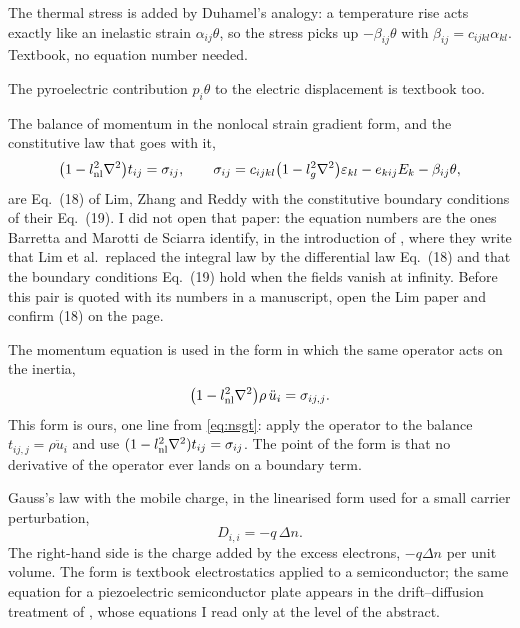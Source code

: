 \documentclass[11pt]{article}
\begin{document}
The thermal stress is added by Duhamel's analogy: a temperature rise acts exactly like an inelastic strain
$\alpha_{ij}\theta$, so the stress picks up $-\beta_{ij}\theta$ with
$\beta_{ij}=c_{ijkl}\alpha_{kl}$. Textbook, no equation number needed.

The pyroelectric contribution $p_i\theta$ to the electric displacement is textbook too.

The balance of momentum in the nonlocal strain gradient form, and the constitutive law that goes with it,
\begin{equation}
\bigl(1-l_{\rm nl}^2\nabla^2\bigr)t_{ij}=\sigma_{ij},\qquad
\sigma_{ij}=c_{ijkl}\bigl(1-l_g^2\nabla^2\bigr)\varepsilon_{kl}
-e_{kij}E_k-\beta_{ij}\theta ,
\label{eq:nsgt}
\end{equation}
are Eq.~(18) of Lim, Zhang and Reddy with the constitutive boundary conditions of their Eq.~(19). I did not
open that paper: the equation numbers are the ones Barretta and Marotti de Sciarra identify, in the
introduction of \cite{Barretta2018}, where they write that Lim et al.\ replaced the integral law by the
differential law Eq.~(18) and that the boundary conditions Eq.~(19) hold when the fields vanish at
infinity. Before this pair is quoted with its numbers in a manuscript, open the Lim paper and confirm (18)
on the page.

The momentum equation is used in the form in which the same operator acts on the inertia,
\begin{equation}
\bigl(1-l_{\rm nl}^2\nabla^2\bigr)\rho\,\ddot u_i=\sigma_{ij,j}.
\label{eq:mom}
\end{equation}
This form is ours, one line from \eqref{eq:nsgt}: apply the operator to the balance $t_{ij,j}=\rho\ddot
u_i$ and use $(1-l_{\rm nl}^2\nabla^2)t_{ij}=\sigma_{ij}$. The point of the form is that no derivative of
the operator ever lands on a boundary term.

Gauss's law with the mobile charge, in the linearised form used for a small carrier perturbation,
\begin{equation}
D_{i,i}=-q\,\Delta n .
\label{eq:gauss}
\end{equation}
The right-hand side is the charge added by the excess electrons, $-q\Delta n$ per unit volume. The form is
textbook electrostatics applied to a semiconductor; the same equation for a piezoelectric semiconductor
plate appears in the drift--diffusion treatment of \cite{YangZhou2005}, whose equations I read only at the
level of the abstract.
\end{document}
